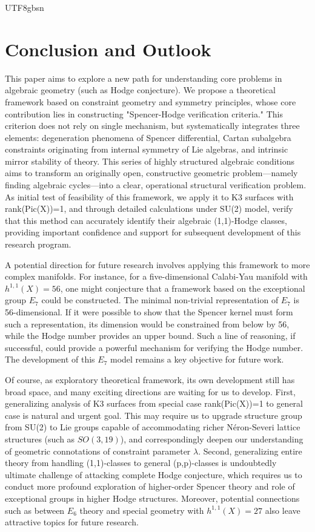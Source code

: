 \documentclass[a4paper,12pt]{extarticle}
\theoremstyle{definition}
\begin{document}
\begin{CJK}{UTF8}{gbsn}
\section{Conclusion and Outlook}

This paper aims to explore a new path for understanding core problems in algebraic geometry (such as Hodge conjecture). We propose a theoretical framework based on constraint geometry and symmetry principles, whose core contribution lies in constructing "Spencer-Hodge verification criteria." This criterion does not rely on single mechanism, but systematically integrates three elements: degeneration phenomena of Spencer differential, Cartan subalgebra constraints originating from internal symmetry of Lie algebras, and intrinsic mirror stability of theory. This series of highly structured algebraic conditions aims to transform an originally open, constructive geometric problem—namely finding algebraic cycles—into a clear, operational structural verification problem. As initial test of feasibility of this framework, we apply it to K3 surfaces with rank(Pic(X))=1, and through detailed calculations under SU(2) model, verify that this method can accurately identify their algebraic (1,1)-Hodge classes, providing important confidence and support for subsequent development of this research program.

A potential direction for future research involves applying this framework to more complex manifolds. For instance, for a five-dimensional Calabi-Yau manifold with $h^{1,1}(X)=56$, one might conjecture that a framework based on the exceptional group $E_7$ could be constructed. The minimal non-trivial representation of $E_7$ is 56-dimensional. If it were possible to show that the Spencer kernel must form such a representation, its dimension would be constrained from below by 56, while the Hodge number provides an upper bound. Such a line of reasoning, if successful, could provide a powerful mechanism for verifying the Hodge number. The development of this $E_7$ model remains a key objective for future work.

Of course, as exploratory theoretical framework, its own development still has broad space, and many exciting directions are waiting for us to develop. First, generalizing analysis of K3 surfaces from special case rank(Pic(X))=1 to general case is natural and urgent goal. This may require us to upgrade structure group from SU(2) to Lie groups capable of accommodating richer Néron-Severi lattice structures (such as $SO(3,19)$), and correspondingly deepen our understanding of geometric connotations of constraint parameter $\lambda$. Second, generalizing entire theory from handling (1,1)-classes to general (p,p)-classes is undoubtedly ultimate challenge of attacking complete Hodge conjecture, which requires us to conduct more profound exploration of higher-order Spencer theory and role of exceptional groups in higher Hodge structures. Moreover, potential connections such as between $E_6$ theory and special geometry with $h^{1,1}(X)=27$ also leave attractive topics for future research.


\end{CJK}
\end{document}
